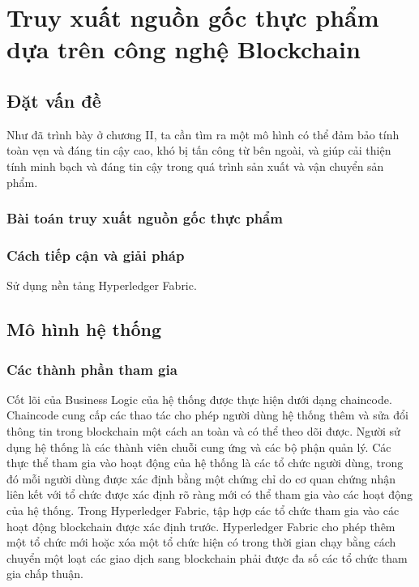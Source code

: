 \chapter{ Truy xuất nguồn gốc thực phẩm dựa trên công nghệ Blockchain}
\section{Đặt vấn đề}

Như đã trình bày ở chương II, ta cần tìm ra một mô hình có thể đảm bảo 
tính toàn vẹn và đáng tin cậy cao, khó bị tấn công từ bên ngoài, và giúp 
cải thiện tính minh bạch và đáng tin cậy trong quá trình sản xuất và vận 
chuyển sản phẩm.  
\subsection{Bài toán truy xuất nguồn gốc thực phẩm}
\subsection{Cách tiếp cận và giải pháp}

Sử dụng nền tảng Hyperledger Fabric.

\section{Mô hình hệ thống}
\subsection{Các thành phần tham gia}

Cốt lõi của Business Logic của hệ thống được thực hiện dưới dạng 
chaincode. Chaincode cung cấp các thao tác cho phép người dùng hệ thống thêm và sửa đổi 
thông tin trong blockchain một cách an toàn và có thể theo dõi được. Người sử dụng hệ thống
là các thành viên chuỗi cung ứng và các bộ phận quản lý. Các thực thể tham gia 
vào hoạt động của hệ thống là các tổ chức người dùng, trong đó mỗi người dùng được xác định 
bằng một chứng chỉ do cơ quan chứng nhận liên kết với tổ chức được xác định rõ ràng mới có thể 
tham gia vào các hoạt động của hệ thống. Trong Hyperledger Fabric, tập hợp các tổ chức tham 
gia vào các hoạt động blockchain được xác định trước. Hyperledger Fabric cho phép thêm một tổ 
chức mới hoặc xóa một tổ chức hiện có trong thời gian chạy bằng cách chuyển một loạt các 
giao dịch sang blockchain phải được đa số các tổ chức tham gia chấp thuận.

